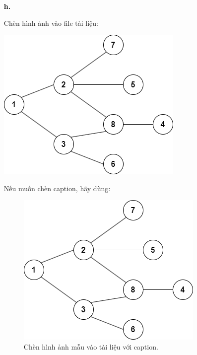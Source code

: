 \begin{itemize}
      \item[\textcolor{black}{\textbf{h.}}] {
        Chèn hình ảnh vào file tài liệu:
        \begin{center}
            \includegraphics[scale=0.585]{./Resources/Images/image_sample.png}
        \end{center}

        Nếu muốn chèn caption, hãy dùng:
        \begin{figure}[ht]
            \centering
            \includegraphics[scale=0.585]{./Resources/Images/image_sample.png}
            \caption{Chèn hình ảnh mẫu vào tài liệu với caption.}
            \label{fig:image-sample}
        \end{figure}
        
      }
\end{itemize}